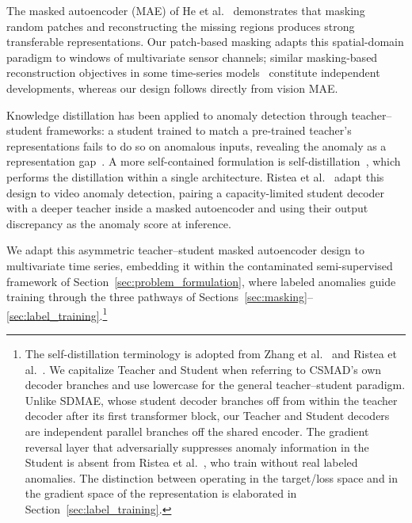 The masked autoencoder (MAE) of He et al.~\cite{he2022mae} demonstrates that masking random patches and reconstructing the missing regions produces strong transferable representations.
Our patch-based masking adapts this spatial-domain paradigm to windows of multivariate sensor channels; similar masking-based reconstruction objectives in some time-series models~\cite{fang2024tfmae} constitute independent developments, whereas our design follows directly from vision MAE.

Knowledge distillation has been applied to anomaly detection through teacher--student frameworks: a student trained to match a pre-trained teacher's representations fails to do so on anomalous inputs, revealing the anomaly as a representation gap~\cite{bergmann2020uninformed,deng2022reverse}.
A more self-contained formulation is self-distillation~\cite{zhang2022selfdistill}, which performs the distillation within a single architecture.
Ristea et al.~\cite{ristea2024sdmae} adapt this design to video anomaly detection, pairing a capacity-limited student decoder with a deeper teacher inside a masked autoencoder and using their output discrepancy as the anomaly score at inference.

We adapt this asymmetric teacher--student masked autoencoder design to multivariate time series, embedding it within the contaminated semi-supervised framework of Section~\ref{sec:problem_formulation}, where labeled anomalies guide training through the three pathways of Sections~\ref{sec:masking}--\ref{sec:label_training}.\footnote{%
  The self-distillation terminology is adopted from Zhang et al.~\cite{zhang2022selfdistill} and Ristea et al.~\cite{ristea2024sdmae}.
  We capitalize Teacher and Student when referring to CSMAD's own decoder branches and use lowercase for the general teacher--student paradigm.
  Unlike SDMAE, whose student decoder branches off from within the teacher decoder after its first transformer block, our Teacher and Student decoders are independent parallel branches off the shared encoder.
  The gradient reversal layer that adversarially suppresses anomaly information in the Student is absent from Ristea et al.~\cite{ristea2024sdmae}, who train without real labeled anomalies.
  The distinction between operating in the target/loss space and in the gradient space of the representation is elaborated in Section~\ref{sec:label_training}.}
